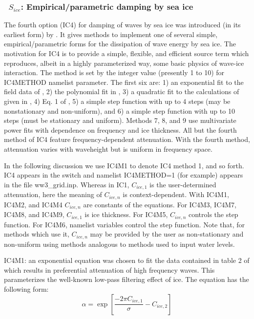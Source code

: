 \vsssub
\subsubsection{~$S_{ice}$: Empirical/parametric damping by sea ice} \label{sec:ICE4}
\vsssub


\noindent
The fourth option ({\code IC4}) for damping of waves by sea ice was introduced (in its earliest form) by \cite{rep:CR17}. It gives methods to implement one of several simple, empirical/parametric forms for the dissipation of wave energy by sea ice.  The motivation for {\code IC4} is to provide a simple, flexible, and efficient source term which reproduces, albeit in a highly parameterized way, some basic physics of wave-ice interaction. The method is set by the integer value (presently 1 to 10) for {\code IC4METHOD} namelist parameter. The first six are: 1) an exponential fit to the field data of \cite{art:WAD88}, 2) the polynomial fit in \cite{art:MBK14}, 3) a quadratic fit to the calculations of \cite{art:KM08} given in \cite{art:HT15}, 4) Eq. 1 of \cite{art:Ko14}, 5) a simple step function with up to 4 steps (may be nonstationary and non-uniform), and  6) a simple step function with up to 10 steps (must be stationary and uniform). Methods 7, 8, and 9 use multivariate power fits with dependence on frequency and ice thickness. All but the fourth method of {\code IC4} feature frequency-dependent attenuation. With the fourth method, attenuation varies with waveheight but is uniform in frequency space.

In the following discussion we use {\code IC4M1} to denote {\code IC4} method 1, and so forth. {\code IC4} appears in the {\file switch} and namelist {\code IC4METHOD=1} (for example) appears in the file {\file ww3\_grid.inp}. Whereas in {\code IC1}, ${C_{ice,1}}$ is the user-determined attenuation, here the meaning of ${C_{ice,n}}$ is context-dependent. With {\code IC4M1}, {\code IC4M2}, and {\code IC4M4} ${C_{ice,n}}$ are constants of the equations. For {\code IC4M3}, {\code IC4M7}, {\code IC4M8}, and {\code IC4M9}, ${C_{ice,1}}$ is ice thickness. For {\code IC4M5}, ${C_{ice,n}}$ controls the step function. For {\code IC4M6}, namelist variables control the step function. Note that, for methods which use it, ${C_{ice,n}}$ may be provided by the user as non-stationary and non-uniform using methods analogous to methods used to input water levels.

{\code IC4M1}: an exponential equation was chosen to fit the data contained in table 2 of \cite{art:WAD88} which results in preferential attenuation of high frequency waves. This parameterizes the well-known low-pass filtering effect of ice. The equation has the following form:
\begin{equation}\label{eq:ice1}
  {\alpha} = \exp\left[\frac{-{2\pi}C_{ice, 1}}{{\sigma}} - C_{ice, 2}\right]
\end{equation}

